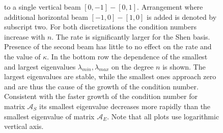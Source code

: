 \documentclass{marine_2015}
\begin{document}
\begin{figure}[t!]
{ to a single vertical beam $\left[0, -1\right]-\left[0, 1\right]$. Arrangement 
 where additional horizontal beam $\left[-1, 0\right]-\left[1, 0\right]$ is added 
 is denoted by subscript two. For both discretizations the condition numbers
 increase with $n$. The rate is significantly larger for the Shen basis. Presence 
 of the second beam has little to no effect on the rate and the value of $\kappa$. 
 In the bottom row the dependence of the smallest and largest eigenvalues $\lambda_{min}, \lambda_{max}$ 
 on the degree $n$ is shown. The largest eigenvalues are stable, while the smallest 
 ones approach zero and are thus the cause of the growth of the condition number. 
 Consistent with the faster growth of the condition number for matrix $\mathcal{A}_S$ 
 its smallest eigenvalue decreases more rapidly than the smallest eigenvalue of 
 matrix $\mathcal{A}_E$. Note that all plots use logarithmic vertical axis.}
 \label{fig:no_precon}
 \end{figure}
\end{document}
